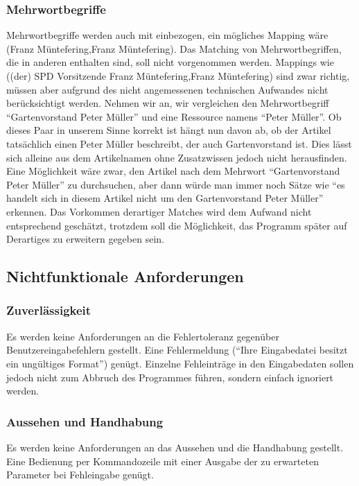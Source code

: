 \subsubsection{Mehrwortbegriffe}
Mehrwortbegriffe werden auch mit einbezogen, ein mögliches Mapping wäre (Franz Müntefering,Franz Müntefering).
Das Matching von Mehrwortbegriffen, die in anderen enthalten sind, soll nicht vorgenommen werden.
Mappings wie ((der) SPD Vorsitzende Franz Müntefering,Franz Müntefering) sind zwar richtig, müssen aber aufgrund des nicht angemessenen technischen Aufwandes nicht berücksichtigt werden.
Nehmen wir an, wir vergleichen den Mehrwortbegriff "`Gartenvorstand Peter Müller"' und eine Ressource namens "`Peter Müller"'.
Ob dieses Paar in unserem Sinne korrekt ist hängt nun davon ab, ob der Artikel tatsächlich einen Peter Müller beschreibt, der auch Gartenvorstand ist.
Dies lässt sich alleine aus dem Artikelnamen ohne Zusatzwissen jedoch nicht herausfinden.
Eine Möglichkeit wäre zwar, den Artikel nach dem Mehrwort "`Gartenvorstand Peter Müller"' zu durchsuchen, aber dann würde man immer noch Sätze wie 
"`es handelt sich in diesem Artikel nicht um den Gartenvorstand Peter Müller"' erkennen.
Das Vorkommen derartiger Matches wird dem Aufwand nicht entsprechend geschätzt, trotzdem soll die Möglichkeit, das Programm später auf Derartiges zu erweitern gegeben sein.

\subsection{Nichtfunktionale Anforderungen}

\subsubsection{Zuverlässigkeit}
Es werden keine Anforderungen an die Fehlertoleranz gegenüber Benutzereingabefehlern gestellt.
Eine Fehlermeldung ("`Ihre Eingabedatei besitzt ein ungültiges Format"') genügt.
Einzelne Fehleinträge in den Eingabedaten sollen jedoch nicht zum Abbruch des Programmes führen, sondern einfach ignoriert werden.

\subsubsection{Aussehen und Handhabung}
Es werden keine Anforderungen an das Aussehen und die Handhabung gestellt.
Eine Bedienung per Kommandozeile mit einer Ausgabe der zu erwarteten Parameter bei Fehleingabe genügt.

